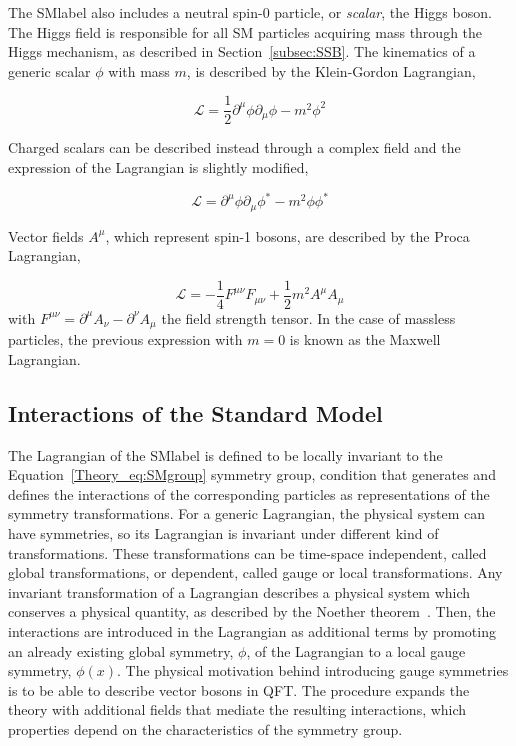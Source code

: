 The \acrshort{SMlabel} also includes a neutral spin-0 particle, or \textit{scalar}, the Higgs boson. The Higgs field is responsible for all SM particles acquiring mass through the Higgs mechanism, as described in Section~\ref{subsec:SSB}.
The kinematics of a generic scalar $\phi$ with mass $m$, is described by the Klein-Gordon Lagrangian,

\begin{equation}
    \label{Theory_eq:KGeq}
    \mathcal{L}=\frac{1}{2}\partial^\mu\phi\partial_\mu\phi - m^2\phi^2
\end{equation}

Charged scalars can be described instead through a complex field and the expression of the Lagrangian is slightly modified,

\begin{equation}
    \label{Theory_eq:KGeqcharged}
    \mathcal{L}=\partial^\mu\phi\partial_\mu\phi^* - m^2\phi\phi^*
\end{equation}

Vector fields $A^\mu$, which represent spin-1 bosons, are described by the Proca Lagrangian,

\begin{equation}
    \label{Theory_eq:Proca}
    \mathcal{L}=-\frac{1}{4}F^{\mu\nu}F_{\mu\nu}+\frac{1}{2}m^2A^\mu A_\mu
\end{equation}
with $F^{\mu\nu}=\partial^\mu A_\nu -\partial^\nu A_\mu$ the field strength tensor.
In the case of massless particles, the previous expression with $m=0$ is known as the Maxwell Lagrangian.

\subsection{Interactions of the Standard Model}
\label{subsec:SMinteractions}
The Lagrangian of the \acrshort{SMlabel} is defined to be locally invariant to the Equation~\ref{Theory_eq:SMgroup} symmetry group,
condition that generates and defines the interactions of the corresponding particles as representations of the symmetry transformations.
For a generic Lagrangian, the physical system can have symmetries, so its Lagrangian is invariant under different kind of transformations.
These transformations can be time-space independent, called global transformations, or dependent, called gauge or local transformations.
Any invariant transformation of a Lagrangian describes a physical system which conserves a physical quantity,
as described by the Noether theorem~\cite{Noether}.
Then, the interactions are introduced in the Lagrangian as additional terms by promoting an already existing global symmetry, $\phi$,
of the Lagrangian to a local gauge symmetry, $\phi(x)$. The physical motivation behind introducing gauge symmetries
is to be able to describe vector bosons in \acrshort{QFT}.
The procedure expands the theory with additional fields that mediate the resulting interactions,
which properties depend on the characteristics of the symmetry group.


